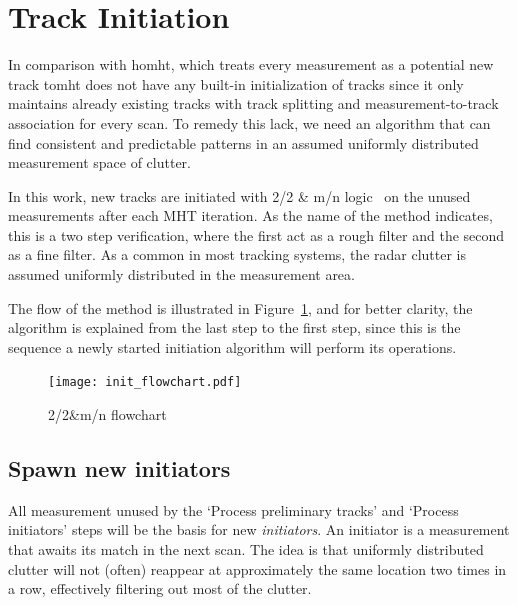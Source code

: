\section{Track Initiation}
In comparison with \gls{homht}, which treats every measurement as a potential new track \gls{tomht} does not have any built-in initialization of tracks since it only maintains already existing tracks with track splitting and measurement-to-track association for every scan. To remedy this lack, we need an algorithm that can find consistent and predictable patterns in an assumed uniformly distributed measurement space of clutter. 

In this work, new tracks are initiated with 2/2 \& m/n logic~\cite{Vo2015} on the unused measurements after each MHT iteration. As the name of the method indicates, this is a two step verification, where the first act as a rough filter and the second as a fine filter. As a common in most tracking systems, the radar clutter is assumed uniformly distributed in the measurement area. 

The flow of the method is illustrated in Figure~\ref{fig:init_flowchart}, and for better clarity, the algorithm is explained from the last step to the first step, since this is the sequence a newly started initiation algorithm will perform its operations.
\begin{figure}[H]
\centering
\texttt{[image: init\_flowchart.pdf]}
\caption{2/2\&m/n flowchart}\label{fig:init_flowchart}
\end{figure}

\subsection{Spawn new initiators}
All measurement unused by the `Process preliminary tracks' and `Process initiators' steps will be the basis for new \emph{initiators}. An initiator is a measurement that awaits its match in the next scan. The idea is that uniformly distributed clutter will not (often) reappear at approximately the same location two times in a row, effectively filtering out most of the clutter.

